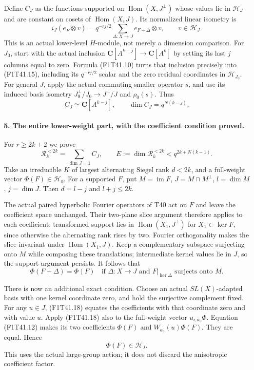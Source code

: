 Define \(C_J\) as the functions supported on
\(\operatorname{Hom}(X,J^\perp)\) whose values lie in
\(\mathcal H_J\) and are constant on cosets of
\(\operatorname{Hom}(X,J)\). Its normalized
linear isometry is
\[
 i_J(e_{\bar F}\otimes v)
       =q^{-rj/2}\sum_{\Delta:X\to J}e_{F+\Delta}\otimes v,
                         \qquad v\in\mathcal H_J.
 \tag{F1T41.15}
\]
This is an actual lower-level \(H\)-module, not merely
a dimension comparison. For \(J_0\), start with the
actual inclusion \(\mathbf C[A^{k-j}]\to\mathbf C[A^k]\)
by setting its last \(j\) columns equal to zero.
Formula (F1T41.10) turns that inclusion precisely into
(F1T41.15), including its \(q^{-rj/2}\) scalar and
the zero residual coordinates in \(\mathcal H_{J_0}\).
For general \(J\), apply the actual commuting smaller
operator \(s\), and use its induced basis isometry
\(J_0^\perp/J_0\to J^\perp/J\) and \(\rho_0(s)\).
Thus
\[
       C_J\simeq\mathbf C[A^{k-j}],
                  \qquad\dim C_J=q^{N(k-j)}.
 \tag{F1T41.16}
\]

\paragraph{5. The entire lower-weight part, with the coefficient condition proved.}
For \(r\ge2k+2\) we prove
\[
 \mathcal R_k^{<2k}=\sum_{\dim J=1}C_J,
 \qquad E:=\dim\mathcal R_k^{<2k}<q^{2k+N(k-1)}.
 \tag{F1T41.17}
\]
Take an irreducible \(K\) of largest alternating
Siegel rank \(d<2k\), and a full-weight vector
\(\Phi(F)\in\mathcal H_0\). For a supported \(F\), put
\(M=\operatorname{im}F\), \(J=M\cap M^\perp\),
\(l=\dim M\), \(j=\dim J\). Then
\(d=l-j\) and \(l+j\le2k\).

The actual paired hyperbolic Fourier operators of T40
act on \(F\) and leave the coefficient space unchanged.
Their two-plane slice argument therefore applies to
each coefficient: transformed support lies in
\(\operatorname{Hom}(X_1,J^\perp)\) for
\(X_1\subset\ker F\), since otherwise the alternating
rank rises by two. Fourier orthogonality makes the
slice invariant under \(\operatorname{Hom}(X_1,J)\).
Keep a complementary subspace surjecting onto \(M\)
while composing these translations; intermediate kernel
values lie in \(J\), so the support argument persists.
It follows that
\[
 \Phi(F+\Delta)=\Phi(F)
 \quad\text{if }\Delta:X\to J
       \text{ and }F|_{\ker\Delta}\text{ surjects onto }M.
 \tag{F1T41.18}
\]

There is now an additional exact condition.
Choose an actual \(SL(X)\)-adapted basis with one
kernel coordinate zero, and hold the surjective
complement fixed. For any \(u\in J\), (F1T41.18)
equates the coefficients with that coordinate zero
and with value \(u\). Apply (F1T41.18) also to
the full-weight vector \(u_{i,a_0}\Phi\).
Equation (F1T41.12) makes its two coefficients
\(\Phi(F)\) and \(W_{a_0}(u)\Phi(F)\).
They are equal. Hence
\[
                         \Phi(F)\in\mathcal H_J.
 \tag{F1T41.19}
\]
This uses the actual large-group action; it does not
discard the anisotropic coefficient factor.

